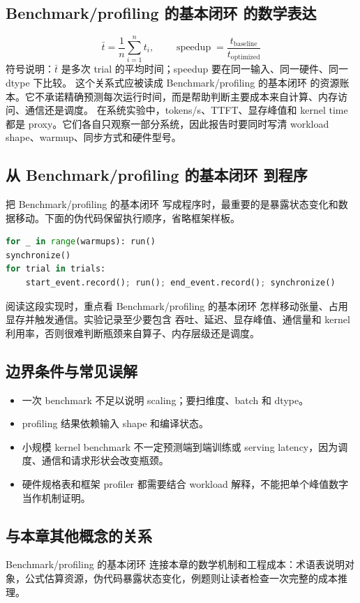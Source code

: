 \documentclass[a4paper]{article}
\begin{document}
\subsection{Benchmark/profiling 的基本闭环 的数学表达}
\[\bar t=\frac{1}{n}\sum_{i=1}^{n}t_i,\qquad \operatorname{speedup}=\frac{t_{\text{baseline}}}{t_{\text{optimized}}}\]
符号说明：\(\bar t\) 是多次 trial 的平均时间；speedup 要在同一输入、同一硬件、同一 dtype 下比较。
这个关系式应被读成 Benchmark/profiling 的基本闭环 的资源账本。它不承诺精确预测每次运行时间，而是帮助判断主要成本来自计算、内存访问、通信还是调度。
在系统实验中，tokens/s、TTFT、显存峰值和 kernel time 都是 proxy。它们各自只观察一部分系统，因此报告时要同时写清 workload shape、warmup、同步方式和硬件型号。
\subsection{从 Benchmark/profiling 的基本闭环 到程序}
把 Benchmark/profiling 的基本闭环 写成程序时，最重要的是暴露状态变化和数据移动。下面的伪代码保留执行顺序，省略框架样板。
\begin{lstlisting}[language=Python]
for _ in range(warmups): run()
synchronize()
for trial in trials:
    start_event.record(); run(); end_event.record(); synchronize()
\end{lstlisting}
阅读这段实现时，重点看 Benchmark/profiling 的基本闭环 怎样移动张量、占用显存并触发通信。实验记录至少要包含 吞吐、延迟、显存峰值、通信量和 kernel 利用率，否则很难判断瓶颈来自算子、内存层级还是调度。
\subsection{边界条件与常见误解}
\begin{itemize}
\item 一次 benchmark 不足以说明 scaling；要扫维度、batch 和 dtype。
\item profiling 结果依赖输入 shape 和编译状态。
\item 小规模 kernel benchmark 不一定预测端到端训练或 serving latency，因为调度、通信和请求形状会改变瓶颈。
\item 硬件规格表和框架 profiler 都需要结合 workload 解释，不能把单个峰值数字当作机制证明。
\end{itemize}
\subsection{与本章其他概念的关系}
Benchmark/profiling 的基本闭环 连接本章的数学机制和工程成本：术语表说明对象，公式估算资源，伪代码暴露状态变化，例题则让读者检查一次完整的成本推理。
\end{document}
